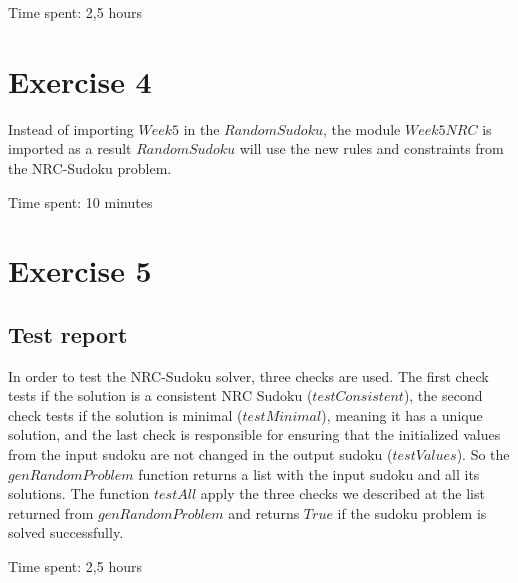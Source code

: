 \documentclass{article}
\begin{document}
Time spent: 2,5 hours

\section*{Exercise 4}
Instead of importing $Week5$ in the $RandomSudoku$, the module $Week5NRC$ is imported as a result $RandomSudoku$ will use the new rules and constraints from the NRC-Sudoku problem. 

Time spent: 10 minutes

\section*{Exercise 5}
\subsection*{Test report}
In order to test the NRC-Sudoku solver, three checks are used. The first check tests if the solution is a consistent NRC Sudoku ($testConsistent$), the second check tests if the solution is minimal ($testMinimal$), meaning it has a unique solution, and the last check is responsible for ensuring that the initialized values from the input sudoku are not changed in the output sudoku ($testValues$).
So the $genRandomProblem$ function returns a list with the input sudoku and all its solutions. The function $testAll$ apply the three checks we described at the list returned from $genRandomProblem$ and returns $True$ if the sudoku problem is solved successfully.


Time spent: 2,5 hours
\end{document}

